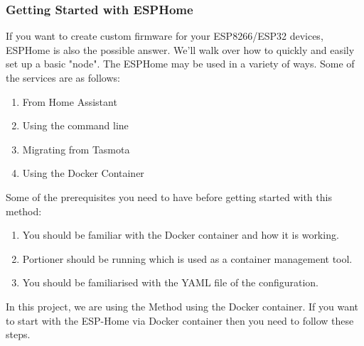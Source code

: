 \documentclass{article}
\begin{document}
	\subsubsection{Getting Started with ESPHome}
	If you want to create custom firmware for your ESP8266/ESP32 devices, ESPHome is also the possible answer. We'll walk over how to quickly and easily set up a basic "node". The ESPHome may be used in a variety of ways. Some of the services are as follows:
	\begin{enumerate}[label=(\arabic*)]
		\item From Home Assistant
		\item Using the command line
		\item Migrating from Tasmota
		\item Using the Docker Container
	\end{enumerate}
	
	Some of the prerequisites you need to have before getting started with this method:
	\begin{enumerate}[label=(\arabic*)]
		\item You should be familiar with the Docker container and how it is working.
		\item Portioner should be running which is used as a container management tool.
		\item You should be familiarised with the YAML file of the configuration.
	\end{enumerate}
	
	In this project, we are using the Method using the Docker container. If you want to start with the ESP-Home via Docker container then you need to follow these steps.
	
\end{document}
